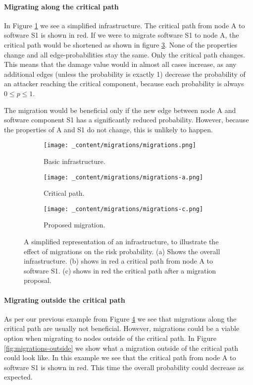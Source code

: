 \paragraph*{Migrating along the critical path}
In Figure \ref{fig:migrations-infrastructure} we see a simplified infrastructure. The critical path from node A to software S1 is shown in red. If we were to migrate software S1 to node A, the critical path would be shortened as shown in figure \ref{fig:migrations-shortened}. None of the properties change and all edge-probabilities stay the same. Only the critical path changes. This means that the damage value would in almost all cases increase, as any additional edges (unless the probability is exactly 1) decrease the probability of an attacker reaching the critical component, because each probability is always \(0 \leq p \leq 1\). 

The migration would be beneficial only if the new edge between node A and software component S1 has a significantly reduced probability. However, because the properties of A and S1 do not change, this is unlikely to happen.

\begin{figure}[H]
    \begin{subfigure}[b]{0.3\textwidth}
        \centering
        \texttt{[image: \_content/migrations/migrations.png]}
        \caption{Basic infrastructure.}
        \label{fig:migrations-infrastructure}
    \end{subfigure}
    \begin{subfigure}[b]{0.3\textwidth}
        \centering
        \texttt{[image: \_content/migrations/migrations-a.png]}
        \caption{Critical path.}
        \label{fig:migrations-basic}
    \end{subfigure}
    \begin{subfigure}[b]{0.3\textwidth}
        \centering
        \texttt{[image: \_content/migrations/migrations-c.png]}
        \caption{Proposed migration.}
        \label{fig:migrations-shortened}
    \end{subfigure}
    \caption{A simplified representation of an infrastructure, to illustrate the effect of migrations on the risk probability. (a) Shows the overall infrastructure. (b) shows in red a critical path from node A to software S1. (c) shows in red the critical path after a migration proposal.}
    \label{fig:migrations-example}
\end{figure}

\paragraph*{Migrating outside the critical path}
As per our previous example from Figure \ref{fig:migrations-example} we see that migrations along the critical path are usually not beneficial. However, migrations could be a viable option when migrating to nodes outside of the critical path. In Figure \ref{fig:migrations-outside} we show what a migration outside of the critical path could look like. In this example we see that the critical path from node A to software S1 is shown in red. This time the overall probability could decrease as expected.  

